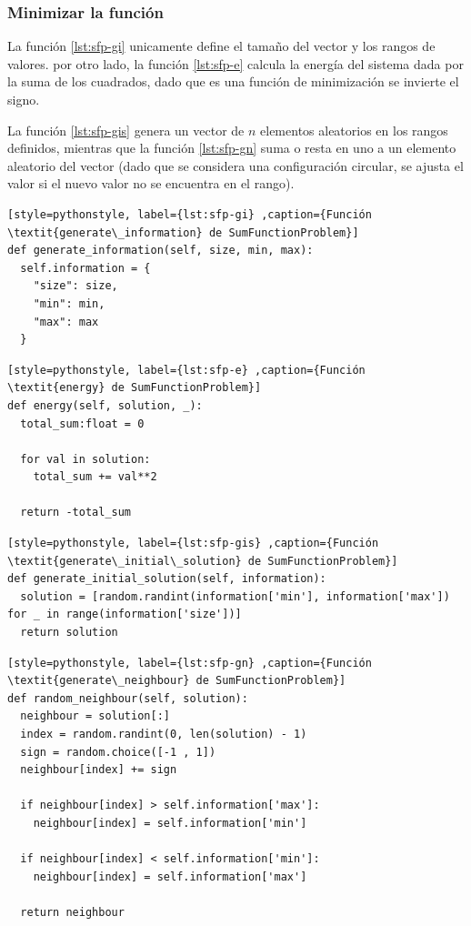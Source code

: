 \documentclass[12pt,twoside]{article}
\begin{document}
	\subsubsection{Minimizar la función}

La función \ref{lst:sfp-gi} unicamente define el tamaño del vector y los rangos de valores. por otro lado, la función \ref{lst:sfp-e} calcula la energía del sistema dada por la suma de los cuadrados, dado que es una función de minimización se invierte el signo.

La función \ref{lst:sfp-gis} genera un vector de $n$ elementos aleatorios en los rangos definidos, mientras que la función \ref{lst:sfp-gn} suma  o resta en uno a un elemento aleatorio del vector (dado que se considera una configuración circular, se ajusta el valor si el nuevo valor no se encuentra en el rango).

\begin{lstlisting}[style=pythonstyle, label={lst:sfp-gi} ,caption={Función \textit{generate\_information} de SumFunctionProblem}]
def generate_information(self, size, min, max):
  self.information = {
	"size": size,
	"min": min,
	"max": max
  }
\end{lstlisting}

\begin{lstlisting}[style=pythonstyle, label={lst:sfp-e} ,caption={Función \textit{energy} de SumFunctionProblem}]
def energy(self, solution, _):
  total_sum:float = 0

  for val in solution:
    total_sum += val**2

  return -total_sum
\end{lstlisting}

\begin{lstlisting}[style=pythonstyle, label={lst:sfp-gis} ,caption={Función \textit{generate\_initial\_solution} de SumFunctionProblem}]
def generate_initial_solution(self, information):
  solution = [random.randint(information['min'], information['max']) for _ in range(information['size'])]
  return solution
\end{lstlisting}

\begin{lstlisting}[style=pythonstyle, label={lst:sfp-gn} ,caption={Función \textit{generate\_neighbour} de SumFunctionProblem}]
def random_neighbour(self, solution):
  neighbour = solution[:]
  index = random.randint(0, len(solution) - 1)
  sign = random.choice([-1 , 1])
  neighbour[index] += sign

  if neighbour[index] > self.information['max']:
	neighbour[index] = self.information['min']

  if neighbour[index] < self.information['min']:
	neighbour[index] = self.information['max']

  return neighbour
\end{lstlisting}
\end{document}

